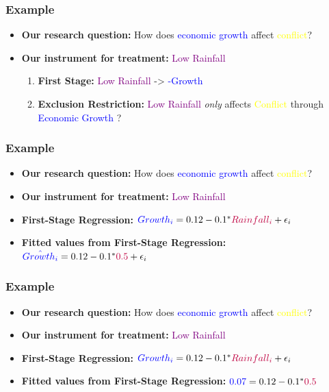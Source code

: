 \documentclass[xcolor=x11names,compress]{beamer}\usepackage[]{graphicx}\usepackage[]{color}
\renewcommand{\(}{\begin{columns}}
\renewcommand{\)}{\end{columns}}
\newcommand{\<}[1]{\begin{column}{#1}}
\renewcommand{\>}{\end{column}}
\begin{document}
\begin{frame}
\frametitle{Example}
\begin{itemize}
\item \textbf{Our research question:} How does \textcolor{blue}{economic growth} affect \textcolor{yellow}{conflict}?
\pause
\item \textbf{Our instrument for treatment:} \textcolor{purple}{Low Rainfall}
\pause
\begin{enumerate}
\item \textbf{First Stage:} \textcolor{purple}{Low Rainfall} -> \textcolor{blue}{-Growth} \pause \checkmark
\pause
\item \textbf{Exclusion Restriction:} \textcolor{purple}{Low Rainfall} \textit{only} affects \textcolor{yellow}{Conflict} through \textcolor{blue}{Economic Growth} \pause ?
\end{enumerate}
\end{itemize}
\end{frame}

\begin{frame}
\frametitle{Example}
\begin{itemize}
\item \textbf{Our research question:} How does \textcolor{blue}{economic growth} affect \textcolor{yellow}{conflict}?
\item \textbf{Our instrument for treatment:} \textcolor{purple}{Low Rainfall}
\item \textbf{First-Stage Regression:} $\textcolor{blue}{Growth_i} = 0.12 - 0.1^{*} \textcolor{purple}{Rainfall_i} + \epsilon_i$
\pause
\item \textbf{Fitted values from First-Stage Regression:} $\textcolor{blue}{\hat{Growth_i}} = 0.12 - 0.1^{*} \textcolor{purple}{0.5} + \epsilon_i$
\end{itemize}
\end{frame}

\begin{frame}
\frametitle{Example}
\begin{itemize}
\item \textbf{Our research question:} How does \textcolor{blue}{economic growth} affect \textcolor{yellow}{conflict}?
\item \textbf{Our instrument for treatment:} \textcolor{purple}{Low Rainfall}
\item \textbf{First-Stage Regression:} $\textcolor{blue}{Growth_i} = 0.12 - 0.1^{*} \textcolor{purple}{Rainfall_i} + \epsilon_i$
\item \textbf{Fitted values from First-Stage Regression:} $\textcolor{blue}{0.07} = 0.12 - 0.1^{*} \textcolor{purple}{0.5}$
\end{itemize}
\end{frame}
\end{document}
